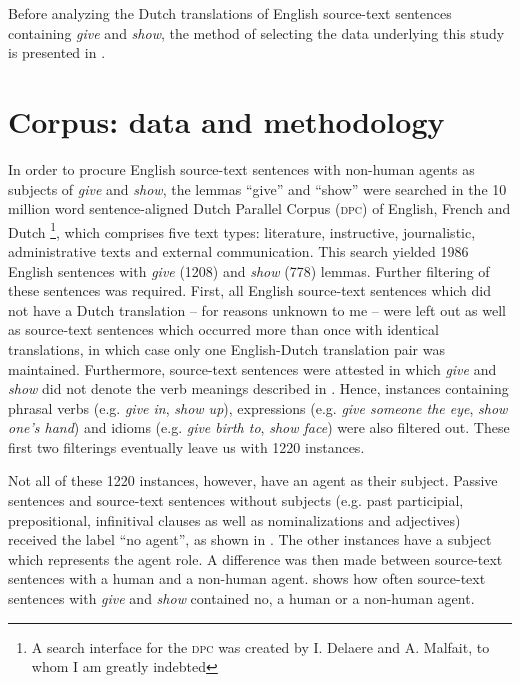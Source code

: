 \documentclass[output=paper]{LSP/langsci}
\begin{document}
Before analyzing the Dutch translations of English source-text sentences containing \textit{give} and \textit{show}, the method of selecting the data underlying this study is presented in .

\section{Corpus: data and methodology} \label{sec:5:5}

In order to procure English source-text sentences with non-human agents as subjects of \textit{give} and \textit{show}, the lemmas “give” and “show” were searched in the 10 million word sentence-aligned Dutch Parallel Corpus (\textsc{dpc}) of English, French and Dutch \citep[see e.g.][]{Rura2008}\footnote{A search interface for the \textsc{dpc} was created by I. Delaere and A. Malfait, to whom I am greatly indebted}, which comprises five text types: literature, instructive, journalistic, administrative texts and external communication. This search yielded 1986 English sentences with \textit{give} (1208) and \textit{show} (778) lemmas. Further filtering of these sentences was required. First, all English source-text sentences which did not have a Dutch translation – for reasons unknown to me – were left out as well as source-text sentences which occurred more than once with identical translations, in which case only one English-Dutch translation pair was maintained. Furthermore, source-text sentences were attested in which \textit{give} and \textit{show} did not denote the verb meanings described in . Hence, instances containing phrasal verbs (e.g. \textit{give in}, \textit{show up}), expressions (e.g. \textit{give someone the eye}, \textit{show one’s hand}) and idioms (e.g. \textit{give birth to}, \textit{show face}) were also filtered out. These first two filterings eventually leave us with 1220 instances.

Not all of these 1220 instances, however, have an agent as their subject. Passive sentences and source-text sentences without subjects (e.g. past participial, prepositional, infinitival clauses as well as nominalizations and adjectives) received the label “no agent”, as shown in . The other instances have a subject which represents the agent role. A difference was then made between source-text sentences with a human and a non-human agent.  shows how often source-text sentences with \textit{give} and \textit{show} contained no, a human or a non-human agent.     
\end{document}
